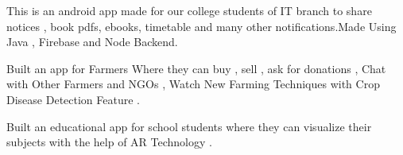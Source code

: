 \documentclass[]{deedy-resume-openfont}
\begin{document}
\begin{minipage}[t]{0.66\textwidth}
\vspace{\topsep} %
\begin{tightemize}
\item This is an android app made for our college students of IT branch to share notices , book pdfs, ebooks, timetable and many other notifications.Made Using Java , Firebase and Node Backend.
\end{tightemize}
\sectionsep

\vspace{\topsep} %
\begin{tightemize}
\item Built an app for Farmers Where they can buy , sell , ask for donations , Chat with Other Farmers and NGOs , Watch New Farming Techniques with Crop Disease Detection Feature .
\end{tightemize}
\sectionsep

\vspace{\topsep} %
\begin{tightemize}
\item Built an educational app for school students where they can visualize their subjects with the help of AR Technology .
\end{tightemize}
\sectionsep


% 
% 

\end{minipage} 
\end{document}
